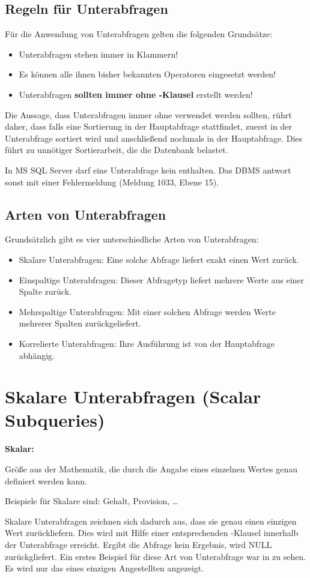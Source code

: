 \subsection{Regeln für Unterabfragen}
Für die Anwendung von Unterabfragen gelten die folgenden Grundsätze:
\begin{itemize}
    \item Unterabfragen stehen immer in Klammern!
    \item Es können alle ihnen bisher bekannten Operatoren eingesetzt werden!
    \item Unterabfragen \textbf{sollten immer ohne \ORDERBY-Klausel} erstellt werden!
\end{itemize}
Die Aussage, dass Unterabfragen immer ohne \ORDERBY{} verwendet werden sollten, rührt daher, dass falls eine Sortierung in der Hauptabfrage stattfindet, zuerst in der Unterabfrage sortiert wird und anschließend nochmals in der Hauptabfrage. Dies führt zu unnötiger Sortierarbeit, die die Datenbank belastet.

\begin{merke}
    In MS SQL Server darf eine Unterabfrage kein \ORDERBY{} enthalten. Das DBMS antwort sonst mit einer Fehlermeldung (Meldung 1033, Ebene 15).
\end{merke}
\subsection{Arten von Unterabfragen}
Grundsätzlich gibt es vier unterschiedliche Arten von Unterabfragen:
\begin{itemize}
    \item Skalare Unterabfragen: Eine solche Abfrage liefert exakt einen Wert zurück.
    \item Einspaltige Unterabfragen: Dieser Abfragetyp liefert mehrere Werte aus einer Spalte zurück.
    \item Mehrspaltige Unterabfragen: Mit einer solchen Abfrage werden Werte mehrerer Spalten zurückgeliefert.
    \item Korrelierte Unterabfragen: Ihre Ausführung ist von der Hauptabfrage abhängig.
\end{itemize}
\section{Skalare Unterabfragen (Scalar Subqueries)}
\begin{merke}
    \textbf{Skalar:}
    \vspace{1em}

    Größe aus der Mathematik, die durch die Angabe eines einzelnen Wertes genau definiert werden kann.
    \vspace{1em}

    Beispiele für Skalare sind: Gehalt, Provision, \dots
\end{merke}
Skalare Unterabfragen zeichnen sich dadurch aus, dass sie genau einen einzigen Wert zurückliefern.   Dies wird mit Hilfe einer entsprechenden \WHERE-Klausel innerhalb der Unterabfrage erreicht. Ergibt die Abfrage kein Ergebnis, wird NULL zurückgliefert. Ein erstes Beispiel für diese Art von Unterabfrage war in  zu sehen. Es wird nur das  eines einzigen Angestellten angezeigt.
